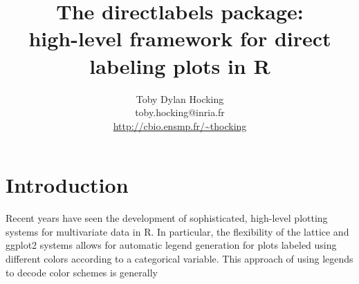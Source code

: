 \documentclass{article}
\title{The directlabels package:\\ high-level framework for direct
  labeling plots in R}
\author{Toby Dylan Hocking\\
  toby.hocking@inria.fr\\
  \url{http://cbio.ensmp.fr/~thocking}
}
\begin{document}
\maketitle

\section{Introduction}

Recent years have seen the development of sophisticated, high-level
plotting systems for multivariate data in R. In particular, the
flexibility of the lattice and ggplot2 systems allows for automatic
legend generation for plots labeled using different colors according
to a categorical variable. This approach of using legends to decode
color schemes is generally
\end{document}
